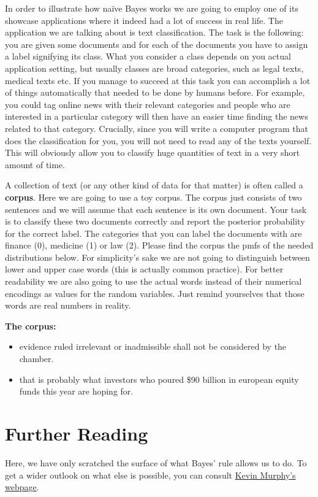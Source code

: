 \documentclass[a4paper,11pt,leqno]{report}
\begin{document}
In order to illustrate how na\"ive Bayes works we are going to employ one of its showcase applications where it indeed had
a lot of success in real life. The application we are talking about is text classification. The task is the following: you
are given some documents and for each of the documents you have to assign a label signifying its class. What you consider
a class depends on you actual application setting, but usually classes are broad categories, such as legal texts, medical
texts etc. If you manage to succeed at this task you can accomplish a lot of things automatically that needed to be done
by humans before. For example, you could tag online news with their relevant categories and people who are interested in
a particular category will then have an easier time finding the news related to that category. Crucially, since you will
write a computer program that does the classification for you, you will not need to read any of the texts yourself. This 
will obviously allow you to classify huge quantities of text in a very short amount of time.

\begin{Exercise}
A collection of text (or any other kind of data for that matter) is often called a \textbf{corpus}. Here we are going to
use a toy corpus. The corpus just consists of two sentences and we will assume that each sentence is its own document.
Your task is to classify these two documents correctly and report the posterior probability for the correct label. 
The categories that you can label the documents with are
finance (0), medicine (1) or law (2). Please find the corpus the pmfs of the needed distributions below. For simplicity's
sake we are not going to distinguish between lower and upper case words (this is actually common practice). For better 
readability we are also going to use the actual words instead of their numerical encodings as values for the random 
variables. Just remind yourselves that those words are real numbers in reality.
\end{Exercise}

\textbf{The corpus:}
\begin{itemize}
\item evidence ruled irrelevant or inadmissible shall not be considered by the chamber.
\item that is probably what investors who poured \$90 billion in european equity funds this year are hoping for.
\end{itemize}

\section*{Further Reading}
Here, we have only scratched the surface of what Bayes' rule allows us to do. To get a wider outlook on what else is possible,
you can consult \href{http://www.cs.ubc.ca/~murphyk/Bayes/bayesrule.html}{Kevin Murphy's webpage}.
\end{document}
